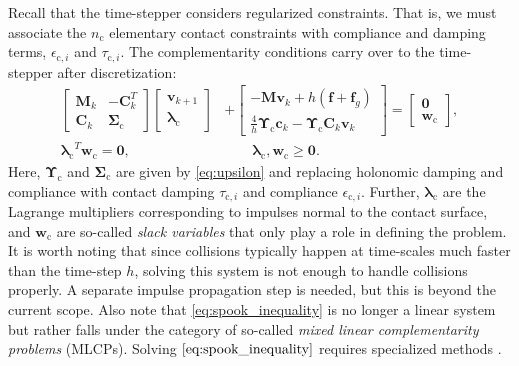 \documentclass[preprint,12pt]{elsarticle}
\let\vec\bm
\let\mat\mathbf
\numberwithin{equation}{section}
\def\tc{\text{c}}
\newcommand{\complementarityalign}[2]{{#1}^T{#2}=\vec{0}, &\qquad #1, #2 \geq \vec{0}}
\begin{document}
Recall that the time-stepper considers regularized constraints.
That is, we must associate the $n_\tc$ elementary contact constraints with compliance and damping terms, $\epsilon_{\tc, i}$ and $\tau_{\tc, i}$.
The complementarity conditions carry over to the time-stepper after discretization:
\begin{equation}
    \begin{aligned}
        \label{eq:spook_inequality}
        \begin{bmatrix}
            \mat{M}_k & -\mat{C}_k^T \\
            \mat{C}_k & \vec{\Sigma}_\tc
        \end{bmatrix}
        \begin{bmatrix}
            \vec{v}_{k+1} \\
            \vec{\lambda}_{\tc}
        \end{bmatrix}
         & +
        \begin{bmatrix}
            -\mat{M}\vec{v}_k + h (\vec{f} + \vec{f}_g) \\
            \frac{4}{h} \mat{\Upsilon}_\tc \vec{c}_k - \mat{\Upsilon}_\tc \mat{C}_k \vec{v}_k
        \end{bmatrix}
        =
        \begin{bmatrix}
            \vec{0} \\ \vec{w}_\tc
        \end{bmatrix}
        ,    \\
        \complementarityalign{\vec{\lambda}_\tc}{\vec{w}_\tc}.
    \end{aligned}
\end{equation}
Here, $\mat{\Upsilon}_\tc$ and $\mat{\Sigma}_\tc$ are given by \eqref{eq:upsilon} and replacing holonomic damping and compliance with contact damping $\tau_{\tc, i}$ and compliance $\epsilon_{\tc, i}$.
Further, $\vec{\lambda}_\tc$ are the Lagrange multipliers corresponding to impulses normal to the contact surface, and $\vec{w}_\tc$ are so-called \emph{slack variables} that only play a role in defining the problem.
It is worth noting that since collisions typically happen at time-scales much faster than the time-step $h$, solving this system is not enough to handle collisions properly.
A separate impulse propagation step is needed, but this is beyond the current scope.
Also note that \eqref{eq:spook_inequality} is no longer a linear system but rather falls under the category of so-called \emph{mixed linear complementarity problems} (MLCPs).
Solving $\eqref{eq:spook_inequality}$ requires specialized methods \cite{renouf20053d}.
\end{document}
